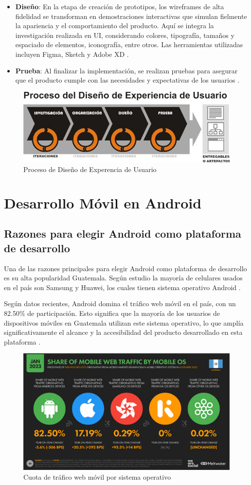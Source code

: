 \begin{itemize}
    \item \textbf{Diseño}: En la etapa de creación de prototipos, los wireframes de alta fidelidad se transforman en demostraciones interactivas que simulan fielmente la apariencia y el comportamiento del producto. Aquí se integra la investigación realizada en UI, considerando colores, tipografía, tamaños y espaciado de elementos, iconografía, entre otros. Las herramientas utilizadas incluyen Figma, Sketch y Adobe XD  \cite{Semi2022}.
    
    \item \textbf{Prueba}: Al finalizar la implementación, se realizan pruebas para asegurar que el producto cumple con las necesidades y expectativas de los usuarios  \cite{Semi2022}.
\end{itemize}

\begin{figure}[H]
    \centering
    \includegraphics[width=0.5\linewidth]{figuras/proceso_diseno.png}
    \caption{Proceso de Diseño de Experencia de Usuario}
    \label{fig:enter-label}
\end{figure}


\section{Desarrollo Móvil en Android}
\subsection{Razones para elegir Android como plataforma de desarrollo}
Una de las razones principales para elegir Android como plataforma de desarrollo es su alta popularidad Guatemala. Según estudio la mayoría de celulares usados en el país son Samsung y Huawei, los cuales tienen sistema operativo Android \cite{Anonimo2019}.

Según datos recientes, Android domina el tráfico web móvil en el país, con un 82.50\% de participación. Esto significa que la mayoría de los usuarios de dispositivos móviles en Guatemala utilizan este sistema operativo, lo que amplía significativamente el alcance y la accesibilidad del producto desarrollado en esta plataforma \cite{Shum2023}.

\begin{figure} [h]
    \centering
    \includegraphics[width=0.5\linewidth]{figuras/mobile_web_traffic.png}
    \caption{Cuota de tráfico web móvil por sistema operativo}
    \label{fig:enter-label}
\end{figure}

